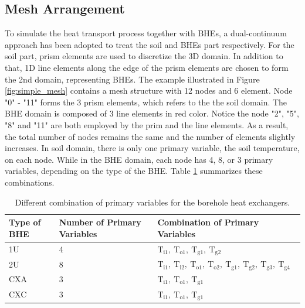 \subsection{Mesh Arrangement}
To simulate the heat transport process together with BHEs, a dual-continuum approach has been adopted to treat the soil and BHEs part respectively. For the soil part, prism elements are used to discretize the 3D domain. In addition to that, 1D line elements along the edge of the prism elements are chosen to form the 2nd domain, representing BHEs. The example illustrated in Figure \ref{fig:simple_mesh} contains a mesh structure with 12 nodes and 6 element. Node "0" - "11" forms the 3 prism elements, which refers to the the soil domain. The BHE domain is composed of 3 line elements in red color. Notice the node "2", "5", "8" and "11" are both employed by the prim and the line elements. As a result, the total number of nodes remains the same and the number of elements slightly increases. In soil domain, there is only one primary variable, the soil temperature, on each node. While in the BHE domain, each node has 4, 8, or 3 primary variables, depending on the type of the BHE. Table \ref{tab:bhe_primary_variables} summarizes these combinations. 
\begin{table}
\caption{Different combination of primary variables for the borehole heat exchangers. }
\label{tab:bhe_primary_variables}
\centering
\begin{tabular}{l l l}
\hline
Type of BHE    & Number of Primary Variables & Combination of Primary Variables \\
\hline
1U             & 4 & $\mathrm{T_{i1},~T_{o1},~T_{g1},~T_{g2}}$\\
2U             & 8 & $\mathrm{T_{i1},~T_{i2},~T_{o1},~T_{o2},~T_{g1},~T_{g2},~T_{g3},~T_{g4}}$\\
CXA            & 3 & $\mathrm{T_{i1},~T_{o1},~T_{g1}}$\\
CXC            & 3 & $\mathrm{T_{i1},~T_{o1},~T_{g1}}$ \\
\hline
\end{tabular}
\end{table}


